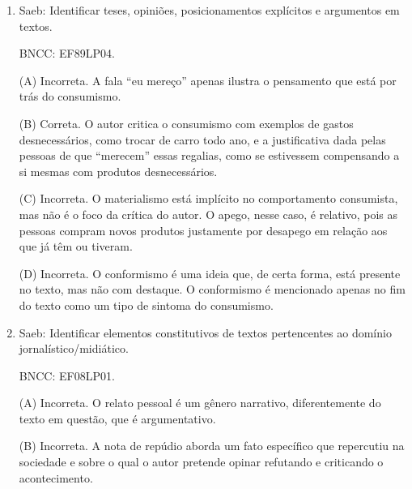 \begin{enumerate}
(A) Incorreta. O gênero textual verbete tem como característica a
ausência de pontos de vista e, por caráter informativo/expositivo,
privilegia o uso da 3ª pessoa.

(B) Correta. O gênero textual verbete tem como característica a
linguagem denotativa, isto é, literal, pois visa a preservar ao máximo o
sentido dicionarizado das palavras e, consequentemente, evitar mais de
uma possibilidade de interpretação do conteúdo, dado o seu caráter
informativo/expositivo e a objetividade exigida num texto conceitual.

(C) Incorreta. O gênero em questão não apresenta opinião e, por
consequência, está ausente dele a subjetividade.

(D) Incorreta. A alternativa apresenta características de uma narrativa,
e não de um texto informativo/expositivo.


\item

Saeb: Identificar teses, opiniões, posicionamentos explícitos e
argumentos em textos.

BNCC: EF89LP04.

(A) Incorreta. A fala ``eu mereço'' apenas ilustra o pensamento que está
por trás do consumismo.

(B) Correta. O autor critica o consumismo com exemplos de gastos
desnecessários, como trocar de carro todo ano, e a justificativa dada
pelas pessoas de que ``merecem'' essas regalias, como se estivessem
compensando a si mesmas com produtos desnecessários.

(C) Incorreta. O materialismo está implícito no comportamento
consumista, mas não é o foco da crítica do autor. O apego, nesse caso, é
relativo, pois as pessoas compram novos produtos justamente por desapego
em relação aos que já têm ou tiveram.

(D) Incorreta. O conformismo é uma ideia que, de certa forma, está
presente no texto, mas não com destaque. O conformismo é mencionado
apenas no fim do texto como um tipo de sintoma do consumismo.

\item

Saeb: Identificar elementos constitutivos de textos pertencentes ao
domínio jornalístico/midiático.

BNCC: EF08LP01.

(A) Incorreta. O relato pessoal é um gênero narrativo, diferentemente do
texto em questão, que é argumentativo.

(B) Incorreta. A nota de repúdio aborda um fato específico que
repercutiu na sociedade e sobre o qual o autor pretende opinar refutando
e criticando o acontecimento.


\end{enumerate}
